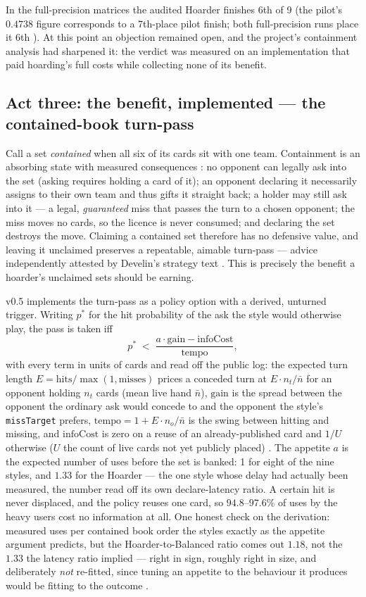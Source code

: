 \documentclass[11pt]{article}
\newcommand{\code}[1]{\texttt{#1}}
\begin{document}
In the full-precision matrices the audited Hoarder finishes 6th of 9 (the pilot's $0.4738$
figure corresponds to a 7th-place pilot finish; both full-precision runs place it 6th
\cite{styles}). At this point an objection remained open, and the project's containment
analysis \cite{containment} had sharpened it: the verdict was measured on an implementation
that paid hoarding's full costs while collecting none of its benefit.

\subsection{Act three: the benefit, implemented --- the contained-book turn-pass}
\label{sec:containedpass}

Call a set \emph{contained} when all six of its cards sit with one team. Containment is an
absorbing state with measured consequences \cite{containment}: no opponent can legally ask
into the set (asking requires holding a card of it); an opponent declaring it necessarily
assigns to their own team and thus gifts it straight back; a holder may still ask into it ---
a legal, \emph{guaranteed} miss that passes the turn to a chosen opponent; the miss moves no
cards, so the licence is never consumed; and declaring the set destroys the move. Claiming a
contained set therefore has no defensive value, and leaving it unclaimed preserves a
repeatable, aimable turn-pass --- advice independently attested by Develin's strategy text
\cite{develin}. This is precisely the benefit a hoarder's unclaimed sets should be earning.

v0.5 implements the turn-pass as a policy option with a derived, unturned trigger. Writing
$p^\ast$ for the hit probability of the ask the style would otherwise play, the pass is taken
iff
\[
p^\ast \;<\; \frac{a \cdot \mathrm{gain} - \mathrm{infoCost}}{\mathrm{tempo}},
\]
with every term in units of cards and read off the public log: the expected turn length
$E = \mathrm{hits}/\max(1, \mathrm{misses})$ prices a conceded turn at $E \cdot n_t/\bar n$
for an opponent holding $n_t$ cards (mean live hand $\bar n$), $\mathrm{gain}$ is the spread
between the opponent the ordinary ask would concede to and the opponent the style's
\code{missTarget} prefers, $\mathrm{tempo} = 1 + E \cdot n_o/\bar n$ is the swing between
hitting and missing, and $\mathrm{infoCost}$ is zero on a reuse of an already-published card
and $1/U$ otherwise ($U$ the count of live cards not yet publicly placed) \cite{styles}. The
appetite $a$ is the expected number of uses before the set is banked: 1 for eight of the nine
styles, and $1.33$ for the Hoarder --- the one style whose delay had actually been measured,
the number read off its own declare-latency ratio. A certain hit is never displaced, and the
policy reuses one card, so $94.8$--$97.6\%$ of uses by the heavy users cost no information at
all. One honest check on the derivation: measured uses per contained book order the styles
exactly as the appetite argument predicts, but the Hoarder-to-Balanced ratio comes out $1.18$,
not the $1.33$ the latency ratio implied --- right in sign, roughly right in size, and
deliberately \emph{not} re-fitted, since tuning an appetite to the behaviour it produces would
be fitting to the outcome \cite{styles}.
\end{document}
